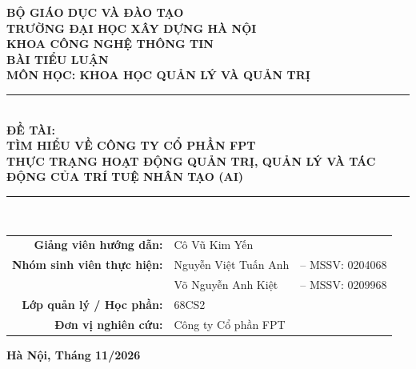 \documentclass[12pt,a4paper]{article}
\begin{document}
\begin{titlepage}

\begin{center}
    \vspace{0.5cm}
    \textbf{\large BỘ GIÁO DỤC VÀ ĐÀO TẠO}\\[0.2cm]
    \textbf{\large TRƯỜNG ĐẠI HỌC XÂY DỰNG HÀ NỘI}\\[0.2cm]
    \textbf{\large KHOA CÔNG NGHỆ THÔNG TIN}\\[1.3cm]

    \textbf{\Large BÀI TIỂU LUẬN}\\[0.3cm]
    \textbf{\LARGE MÔN HỌC: KHOA HỌC QUẢN LÝ VÀ QUẢN TRỊ}\\[1.2cm]

    \rule{0.85\textwidth}{0.6pt}\\[0.4cm]
    {\Large \bfseries ĐỀ TÀI:}\\[0.3cm]
    {\LARGE \bfseries TÌM HIỂU VỀ CÔNG TY CỔ PHẦN FPT}\\[0.2cm]
    {\large \bfseries THỰC TRẠNG HOẠT ĐỘNG QUẢN TRỊ, QUẢN LÝ VÀ TÁC ĐỘNG CỦA TRÍ TUỆ NHÂN TẠO (AI)}\\[0.4cm]
    \rule{0.85\textwidth}{0.6pt}\\[1.8cm]

    \begin{table}[h]
    \centering
    \begin{tabular}{rll}
        \textbf{Giảng viên hướng dẫn:} & Cô Vũ Kim Yến & \\
        \textbf{Nhóm sinh viên thực hiện:} & Nguyễn Việt Tuấn Anh & -- MSSV: 0204068 \\
                                           & Võ Nguyễn Anh Kiệt & -- MSSV: 0209968 \\
        \textbf{Lớp quản lý / Học phần:}   & 68CS2 & \\
        \textbf{Đơn vị nghiên cứu:}        & Công ty Cổ phần FPT &
    \end{tabular}
    \end{table}

    \vfill
    \textbf{Hà Nội, Tháng 11/2026}
\end{center}
\end{titlepage}
\end{document}
